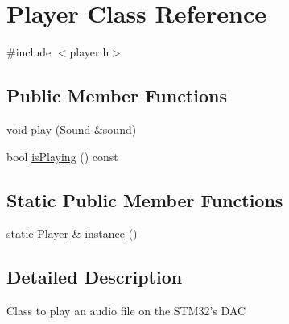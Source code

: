 \hypertarget{class_player}{\section{Player Class Reference}
\label{class_player}
}


{\ttfamily \#include $<$player.\-h$>$}

\subsection*{Public Member Functions}
\begin{DoxyCompactItemize}
\item 
void \hyperlink{class_player_a895c8c46a9862e1c424720be3aa5e7d1}{play} (\hyperlink{class_sound}{Sound} \&sound)
\item 
bool \hyperlink{class_player_a10022c6ffc3a93436a74c584b52a4948}{is\-Playing} () const 
\end{DoxyCompactItemize}
\subsection*{Static Public Member Functions}
\begin{DoxyCompactItemize}
\item 
static \hyperlink{class_player}{Player} \& \hyperlink{class_player_a2bf5cfb2a54c9fde1432fed9eb46fe49}{instance} ()
\end{DoxyCompactItemize}


\subsection{Detailed Description}
Class to play an audio file on the S\-T\-M32's D\-A\-C 

